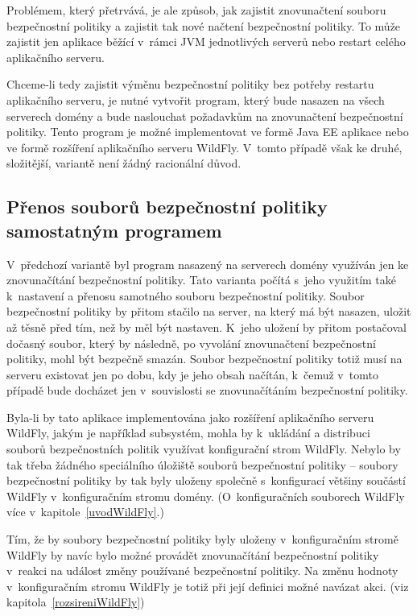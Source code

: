 Problémem, který přetrvává, je ale způsob, jak zajistit znovunačtení souboru bezpečnostní politiky a zajistit tak nové načtení bezpečnostní politiky.
To může zajistit jen aplikace běžící v~rámci JVM jednotlivých serverů nebo restart celého aplikačního serveru.

Chceme-li tedy zajistit výměnu bezpečnostní politiky bez potřeby restartu aplikačního serveru, je nutné vytvořit program,
který bude nasazen na všech serverech domény a bude naslouchat požadavkům na znovunačtení bezpečnostní politiky.
Tento program je možné implementovat ve formě Java EE aplikace nebo ve formě rozšíření aplikačního serveru WildFly.
V~tomto případě však ke druhé, složitější, variantě není žádný racionální důvod.

\subsection{Přenos souborů bezpečnostní politiky samostatným programem} \label{reseniProgramem}

V~předchozí variantě byl program nasazený na serverech domény využíván jen ke znovunačítání bezpečnostní politiky.
Tato varianta počítá s~jeho využitím také k~nastavení a přenosu samotného souboru bezpečnostní politiky.
Soubor bezpečnostní politiky by přitom stačilo na server, na který má být nasazen, uložit až těsně před tím, než by měl být nastaven.
K~jeho uložení by přitom postačoval dočasný soubor, který by následně, po vyvolání znovunačtení bezpečnostní politiky, mohl být bezpečně smazán.
Soubor bezpečnostní politiky totiž musí na serveru existovat jen po dobu, kdy je jeho obsah načítán,
k~čemuž v~tomto případě bude docházet jen v~souvislosti se znovunačítáním bezpečnostní politiky.

Byla-li by tato aplikace implementována jako rozšíření aplikačního serveru WildFly, jakým je například subsystém,
mohla by k~ukládání a distribuci souborů bezpečnostních politik využívat konfigurační strom WildFly.
Nebylo by tak třeba žádného speciálního úložiště souborů bezpečnostní politiky -- soubory bezpečnostní politiky
by tak byly uloženy společně s~konfigurací většiny součástí WildFly v~konfiguračním stromu domény.
(O~konfiguračních souborech WildFly více v~kapitole~\ref{uvodWildFly}.)

Tím, že by soubory bezpečnostní politiky byly uloženy v~konfiguračním stromě WildFly by navíc bylo možné provádět znovunačítání
bezpečnostní politiky v~reakci na událost změny používané bezpečnostní politiky.
Na změnu hodnoty v~konfiguračním stromu WildFly je totiž při její definici možné navázat akci. (viz kapitola~\ref{rozsireniWildFly})

